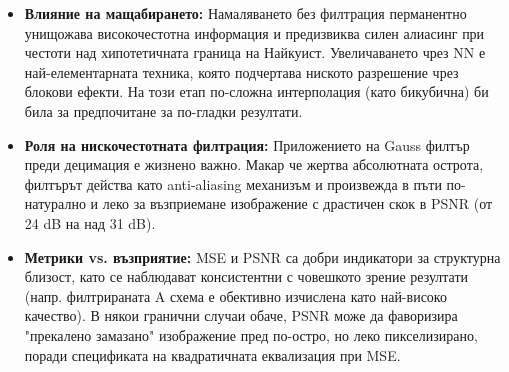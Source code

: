 \documentclass[12pt]{article}
\begin{document}
\begin{itemize}
    \item \textbf{Влияние на мащабирането:} Намаляването без филтрация перманентно унищожава високочестотна информация и предизвиква силен алиасинг при честоти над хипотетичната граница на Найкуист. Увеличаването чрез NN е най-елементарната техника, която подчертава ниското разрешение чрез блокови ефекти. На този етап по-сложна интерполация (като бикубична) би била за предпочитане за по-гладки резултати.
    \item \textbf{Роля на нискочестотната филтрация:} Приложението на Gauss филтър преди децимация е жизнено важно. Макар че жертва абсолютната острота, филтърът действа като anti-aliasing механизъм и произвежда в пъти по-натурално и леко за възприемане изображение с драстичен скок в PSNR (от 24 dB на над 31 dB).
    \item \textbf{Метрики vs. възприятие:} MSE и PSNR са добри индикатори за структурна близост, като се наблюдават консистентни с човешкото зрение резултати (напр. филтрираната A схема е обективно изчислена като най-високо качество). В някои гранични случаи обаче, PSNR може да фаворизира "прекалено замазано" изображение пред по-остро, но леко пикселизирано, поради спецификата на квадратичната еквализация при MSE.
\end{itemize}
\end{document}

